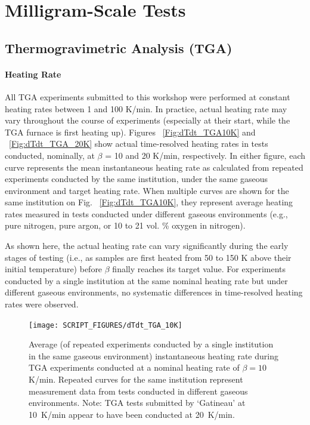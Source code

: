 \documentclass{book}
\begin{document}
\section{Milligram-Scale Tests}

\subsection{Thermogravimetric Analysis (TGA)}

\paragraph{Heating Rate}

All TGA experiments submitted to this workshop were performed at constant heating rates between 1 and 100 K/min. In practice, actual heating rate may vary throughout the course of experiments (especially at their start, while the TGA furnace is first heating up). Figures ~\ref{Fig:dTdt_TGA10K} and ~\ref{Fig:dTdt_TGA_20K} show actual time-resolved heating rates in tests conducted, nominally, at $\beta$ = 10 and 20 K/min, respectively. In either figure, each curve represents the mean instantaneous heating rate as calculated from repeated experiments conducted by the same institution, under the same gaseous environment and target heating rate. When multiple curves are shown for the same institution on Fig. ~\ref{Fig:dTdt_TGA10K}, they represent average heating rates measured in tests conducted under different gaseous environments (e.g., pure nitrogen, pure argon, or 10 to 21 vol. \% oxygen in nitrogen).

As shown here, the actual heating rate can vary significantly during the early stages of testing (i.e., as samples are first heated from 50 to 150 K above their initial temperature) before $\beta$ finally reaches its target value. For experiments conducted by a single institution at the same nominal heating rate but under different gaseous environments, no systematic differences in time-resolved heating rates were observed.

\begin{figure}
  \centering
  \texttt{[image: SCRIPT\_FIGURES/dTdt\_TGA\_10K]}
  \caption{Average (of repeated experiments conducted by a single institution in the same gaseous environment) instantaneous heating rate during TGA experiments conducted at a nominal heating rate of $\beta=10$ K/min. Repeated curves for the same institution represent measurement data from tests conducted in different gaseous environments. Note: TGA tests submitted by ‘Gatineau’ at 10~K/min appear to have been conducted at 20~K/min.}
  \label{Fig:dTdt_TGA_10K}
\end{figure}
\end{document}
